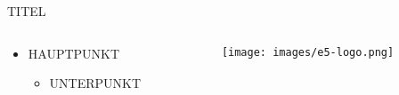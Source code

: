 \begin{frame}{TITEL}
	\begin{columns}[T]
		\begin{column}{.45\textwidth}
				\begin{itemize}
					\item HAUPTPUNKT
						\begin{itemize}
							\item[\to] UNTERPUNKT
						\end{itemize}
				\end{itemize}
		\end{column}
		\begin{column}{.55\textwidth}
				\texttt{[image: images/e5-logo.png]}
		\end{column}
	\end{columns}
\end{frame}
